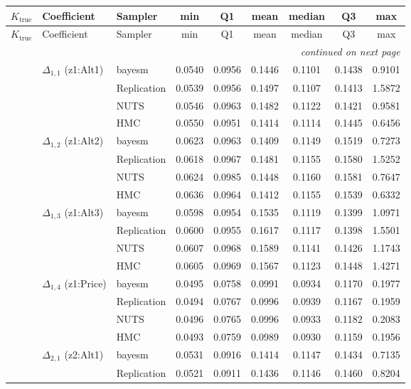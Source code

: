 \begin{longtable}{cllcccccc}
\toprule
$K_{\text{true}}$ & Coefficient & Sampler & min & Q1 & mean & median & Q3 & max \\
\midrule
\endfirsthead
\toprule
$K_{\text{true}}$ & Coefficient & Sampler & min & Q1 & mean & median & Q3 & max \\
\midrule
\endhead
\midrule
\multicolumn{9}{r}{\emph{continued on next page}} \\
\endfoot
\bottomrule
\endlastfoot
1 & $\Delta_{1,1}$ (z1:Alt1) & bayesm & 0.0540 & 0.0956 & 0.1446 & 0.1101 & 0.1438 & 0.9101 \\
 &  & Replication & 0.0539 & 0.0956 & 0.1497 & 0.1107 & 0.1413 & 1.5872 \\
 &  & NUTS & 0.0546 & 0.0963 & 0.1482 & 0.1122 & 0.1421 & 0.9581 \\
 &  & HMC & 0.0550 & 0.0951 & 0.1414 & 0.1114 & 0.1445 & 0.6456 \\
 & $\Delta_{1,2}$ (z1:Alt2) & bayesm & 0.0623 & 0.0963 & 0.1409 & 0.1149 & 0.1519 & 0.7273 \\
 &  & Replication & 0.0618 & 0.0967 & 0.1481 & 0.1155 & 0.1580 & 1.5252 \\
 &  & NUTS & 0.0624 & 0.0985 & 0.1448 & 0.1160 & 0.1581 & 0.7647 \\
 &  & HMC & 0.0636 & 0.0964 & 0.1412 & 0.1155 & 0.1539 & 0.6332 \\
 & $\Delta_{1,3}$ (z1:Alt3) & bayesm & 0.0598 & 0.0954 & 0.1535 & 0.1119 & 0.1399 & 1.0971 \\
 &  & Replication & 0.0600 & 0.0955 & 0.1617 & 0.1117 & 0.1398 & 1.5501 \\
 &  & NUTS & 0.0607 & 0.0968 & 0.1589 & 0.1141 & 0.1426 & 1.1743 \\
 &  & HMC & 0.0605 & 0.0969 & 0.1567 & 0.1123 & 0.1448 & 1.4271 \\
 & $\Delta_{1,4}$ (z1:Price) & bayesm & 0.0495 & 0.0758 & 0.0991 & 0.0934 & 0.1170 & 0.1977 \\
 &  & Replication & 0.0494 & 0.0767 & 0.0996 & 0.0939 & 0.1167 & 0.1959 \\
 &  & NUTS & 0.0496 & 0.0765 & 0.0996 & 0.0933 & 0.1182 & 0.2083 \\
 &  & HMC & 0.0493 & 0.0759 & 0.0989 & 0.0930 & 0.1159 & 0.1956 \\
 & $\Delta_{2,1}$ (z2:Alt1) & bayesm & 0.0531 & 0.0916 & 0.1414 & 0.1147 & 0.1434 & 0.7135 \\
 &  & Replication & 0.0521 & 0.0911 & 0.1436 & 0.1146 & 0.1460 & 0.8204 \\

\end{longtable}
